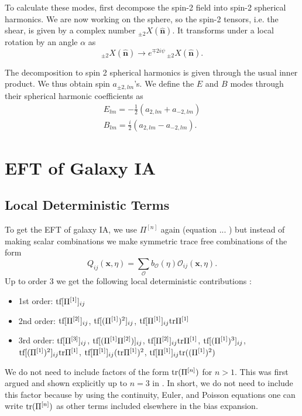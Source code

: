 \documentclass[11pt]{article}
\DeclareRobustCommand{\tr}{\ifmmode\text{tr}\else d\fi}
\DeclareRobustCommand{\tf}{\ifmmode\text{tf}\else d\fi}
\newcommand{\br}[1]{\ensuremath{\left( #1 \right)}}
\begin{document}
To calculate these modes, first decompose the spin-2 field into spin-2 spherical harmonics. We are now working on the sphere, so the spin-2 tensors, i.e. the shear, is given by a complex number $_{\pm 2} X(\hat {\mathbf n})$. It transforms under a local rotation by an angle $\alpha$ as 
\begin{equation}
    _{\pm 2}X(\hat{\mathbf n}) \rightarrow e^{\mp 2i\psi} \,_{\pm 2}X(\hat{\mathbf n}).
\end{equation}

The decomposition to spin 2 spherical harmonics is given through the usual inner product. We thus obtain spin $a_{\pm 2,lm}$'s. We define the $E$ and $B$ modes through their spherical harmonic coefficients as
\begin{gather}
    E_{lm} = -\frac{1}{2}\br{a_{2,lm} + a_{-2,lm}}\\
    B_{lm} = \frac{i}{2}\br{a_{2,lm} - a_{-2,lm}}.
\end{gather}


\section{EFT of Galaxy IA}
\label{sec:galaxyintrinsicalignment}
\subsection{Local Deterministic Terms}
To get the EFT of galaxy IA, we use $\Pi^{[n]}$ again (equation ... %
) but instead of making scalar combinations we make symmetric trace free combinations of the form
\begin{equation}
    Q_{ij}(\mathbf x, \eta) = \sum_{\mathcal O}b_{\mathcal O}(\eta)\mathcal O_{ij}(\mathbf x, \eta).
    \label{eq:shapebiasdeterministic}
\end{equation}
Up to order 3 we get the following local deterministic contributions \cite{Vlah_2020}:
\begin{itemize}
    \item[] 1st order: $\tf[\Pi^{[1]}]_{ij}$ 
    \item[] 2nd order: $\tf[\Pi^{[2]}]_{ij}$, $\tf[(\Pi^{[1]})^{2}]_{ij}$, $\tf[\Pi^{[1]}]_{ij}\tr \Pi^{[1]}$
    \item[] 3rd order: $\tf[\Pi^{[3]}]_{ij}$, $\tf[(\Pi^{[1]}\Pi^{[2]})]_{ij}$, $\tf[\Pi^{[2]}]_{ij}\tr \Pi^{[1]}$, $\tf[(\Pi^{[1]})^{3}]_{ij}$, $\tf[(\Pi^{[1]})^{2}]_{ij}\tr \Pi^{[1]}$, $\tf[\Pi^{[1]}]_{ij}(\tr \Pi^{[1]})^2$, $\tf[\Pi^{[1]}]_{ij}\tr ((\Pi^{[1]})^2)$
\end{itemize}
We do not need to include factors of the form $\tr(\Pi^{[n]})$ for $n>1$. This was first argued and shown explicitly up to $n=3$ in \cite{Mirbabayi_2015}. In short, we do not need to include this factor because by using the continuity, Euler, and Poisson equations one can write $\tr(\Pi^{[n]})$ as other terms included elsewhere in the bias expansion.
\end{document}
